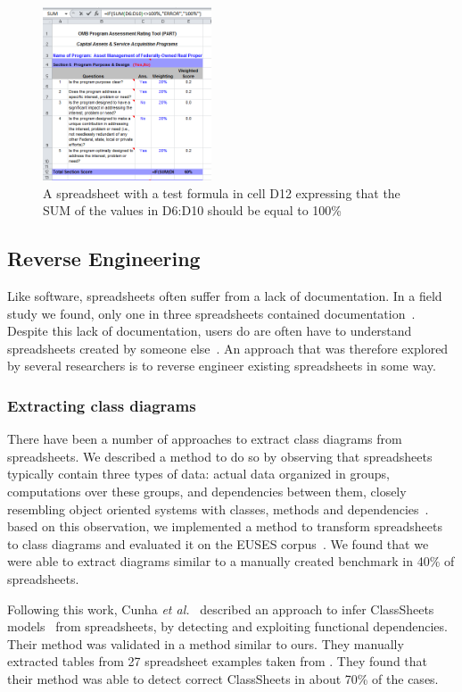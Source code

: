 \documentclass[conference]{IEEEtran}
\begin{document}
\begin{figure}
  \begin{center}
  \includegraphics[width=5cm]{fig/test-example.png}
  \caption{A spreadsheet with a test formula in cell D12 expressing that the SUM of the values in D6:D10 should be equal to 100\%}
  \label{fig:test-example}
  \end{center}
\end{figure} 


\subsection{Reverse Engineering} 
Like software, spreadsheets often suffer from a lack of documentation. In a field study we found, only one in three spreadsheets contained documentation~\cite{hermans_supporting_2011}. Despite this lack of documentation, users do are often have to understand spreadsheets created by someone else~\cite{Ko2011,hermans_supporting_2011}. An approach that was therefore explored by several researchers is to reverse engineer existing spreadsheets in some way.

\subsubsection{Extracting class diagrams}
There have been a number of approaches to extract class diagrams from spreadsheets. We described a method to do so by observing that spreadsheets typically contain three types of data: actual data organized in groups, computations over these groups, and dependencies between them, closely resembling object oriented systems with classes, methods and dependencies~\cite{hermans_automatically_2010}. based on this observation, we implemented a method to transform spreadsheets to class diagrams and evaluated it on the EUSES corpus~\cite{fisher_euses_2005}. We found that we were able to extract diagrams similar to a manually created benchmark in 40\% of spreadsheets.

Following this work, Cunha \emph{et al.}~\cite{cunha_automatically_2010} described an approach to infer ClassSheets models~\cite{engels_classsheets:_2005} from spreadsheets, by detecting and exploiting functional dependencies. Their method was validated in a method similar to ours. They manually extracted tables from 27 spreadsheet examples taken from \cite{management_2003}. They found that their method was able to detect correct ClassSheets in about 70\% of the cases.
\end{document}
